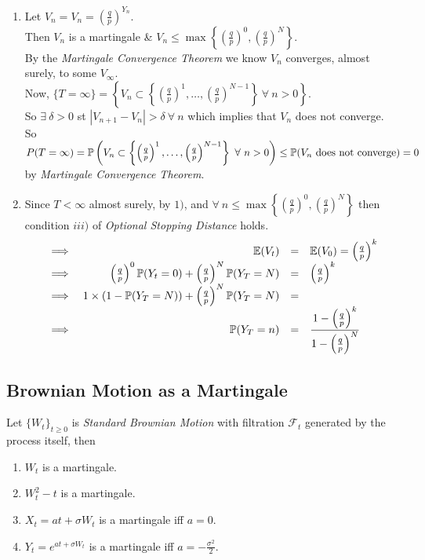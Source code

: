 \documentclass[11pt,a4paper]{article}
\begin{document}
\begin{enumerate}
	\item Let $V_n=V_n=\left(\frac{q}{p}\right)^{Y_n}$.\\
	Then $V_n$ is a martingale \& $V_n\leq\max\left\{\left(\frac{q}{p}\right)^0,\left(\frac{q}{p}\right)^N\right\}$.\\
	By the \textit{Martingale Convergence Theorem} we know $V_n$ converges, almost surely, to some $V_\infty$.\\
	Now, $\{T=\infty\}=\left\{V_n\subset\left\{\left(\frac{q}{p}\right)^1,\dots,\left(\frac{q}{p}\right)^{N-1}\right\}\ \forall\ n>0\right\}$.\\
	So $\exists\ \delta>0$ st $|V_{n+1}-V_n|>\delta\ \forall\ n$ which implies that $V_n$ does not converge.\\
	So $P(T=\infty)=\prob\left(V_n\subset\left\{\left(\frac{q}{p}\right)^1,\dots,\left(\frac{q}{p}\right)^{N-1}\right\}\ \forall\ n>0\right)\leq\prob(V_n\ \mathrm{does\ not\ converge})=0$ by \textit{Martingale Convergence Theorem}.
	\item Since $T<\infty$ almost surely, by $1)$, and $\forall\ n\leq\max\left\{\left(\frac{q}{p}\right)^0,\left(\frac{q}{p}\right)^N\right\}$ then condition $iii)$ of \textit{Optional Stopping Distance} holds.
	\[\begin{array}{rrcl}
	\implies&\mathbb{E}(V_t)&=&\mathbb{E}(V_0)=\left(\frac{q}{p}\right)^k\\
	\implies&\left(\frac{q}{p}\right)^0\mathbb{P}(Y_t=0)+\left(\frac{q}{p}\right)^N\mathbb{P}(Y_T=N)&=&\left(\frac{q}{p}\right)^k\\
	\implies&1\times\left(1-\mathbb{P}(Y_T=N)\right)+\left(\frac{q}{p}\right)^N\mathbb{P}(Y_T=N)&=&\\
	\implies&\mathbb{P}(Y_T=n)&=&\dfrac{1-\left(\frac{q}{p}\right)^k}{1-\left(\frac{q}{p}\right)^N}
	\end{array}\]
\end{enumerate}

\subsection{Brownian Motion as a Martingale}

Let $\{W_t\}_{t\geq0}$ is \textit{Standard Brownian Motion} with filtration $\mathcal{F}_t$ generated by the process itself, then
\begin{enumerate}[label=\arabic*)]
	\item $W_t$ is a martingale.
	\item $W_t^2-t$ is a martingale.
	\item $X_t=at+\sigma W_t$ is a martingale iff $a=0$.
	\item $Y_t=e^{at+\sigma W_t}$ is a martingale iff $a=-\frac{\sigma^2}{2}$.
\end{enumerate}
\end{document}
